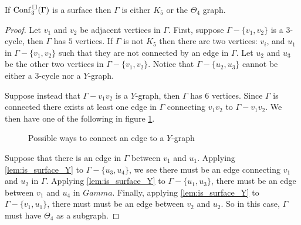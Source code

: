 \begin{thm}
    If \(\mathrm{Conf}^{\,\square}_3(\Gamma)\) is a surface then \(\Gamma\) is either \(K_5\) or the \(\Theta_4\) graph.
\end{thm}
\begin{proof}
    Let \(v_1\) and \(v_2\) be adjacent vertices in \(\Gamma\).
    First, suppose \(\Gamma - \{v_1, v_2\}\) is a \(3\)-cycle, then \(\Gamma\) has \(5\) vertices.
    If \(\Gamma\) is not \(K_5\) then there are two vertices: \(v_i\), and \(u_1\) in \(\Gamma - \{v_1, v_2\}\)
    such that they are not connected by an edge in \(\Gamma\).
    Let \(u_2\) and \(u_3\) be the other two vertices in \(\Gamma - \{v_1, v_2\}\).
    Notice that \(\Gamma - \{u_2, u_3\}\) cannot be either a \(3\)-cycle nor a \(Y\)-graph.

    Suppose instead that \(\Gamma - v_1 v_2\) is a \(Y\)-graph, then \(\Gamma\) has \(6\) vertices.
    Since \(\Gamma\) is connected there exists at least one edge in \(\Gamma\) connecting \(v_1 v_2\) to \(\Gamma - v_1 v_2\).
    We then have one of the following in figure \ref{fig:edgeygraph}.
    \begin{figure}
        \centering
        \quad
        \caption{Possible ways to connect an edge to a \(Y\)-graph}
        \label{fig:edgeygraph}
    \end{figure}

    Suppose that there is an edge in \(\Gamma\) between \(v_1\) and \(u_1\).
    Applying \ref{lem:is_surface_Y} to \(\Gamma - \{u_3, u_4\}\), we see there must be an edge
    connecting \(v_1\) and \(u_2\) in \(\Gamma\).
    Applying \ref{lem:is_surface_Y} to \(\Gamma - \{u_1, u_3\}\), there must be an edge between
    \(v_1\) and \(u_4\) in \(Gamma\).
    Finally, applying \ref{lem:is_surface_Y} to \(\Gamma - \{v_1, u_1\}\), there must must be
    an edge between \(v_2\) and \(u_2\).
    So in this case, \(\Gamma\) must have \(\Theta_4\) as a subgraph.


\end{proof}
